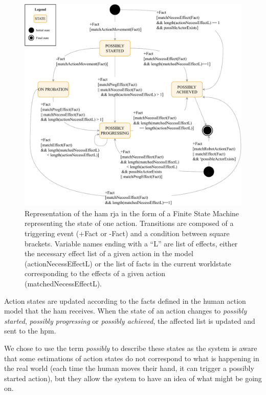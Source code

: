 \documentclass[a4paper,11pt,twoside]{StyleThese}
\begin{document}
\begin{figure}[!hbt]
	\includegraphics[width=\linewidth]{figures/chapter2/action_sm.pdf}
	\caption{Representation of the \acrfull{ham} \acrshort{rja} in the form of a Finite State Machine representing the state of one action. Transitions are composed of a triggering event (+Fact or -Fact) and a condition between square brackets. Variable names ending with a ``L'' are list of effects, either the necessary effect list of a given action in the model (actionNecessEffectL) or the list of facts in the current worldstate corresponding to the effects of a given action (matchedNecessEffectL).}
	\label{chap6:fig:action_monitoring}
\end{figure}

Action states are updated according to the facts defined in the human action model that the \acrshort{ham} receives. When the state of an action changes to \emph{possibly started}, \emph{possibly progressing} or \emph{possibly achieved}, the affected list is updated and sent to the \acrshort{hpm}. 

We chose to use the term \emph{possibly} to describe these states as the system is aware that some estimations of action states do not correspond to what is happening in the real world (\eg each time the human moves their hand, it can trigger a possibly started action), but they allow the system to have an idea of what might be going on.
\end{document}
